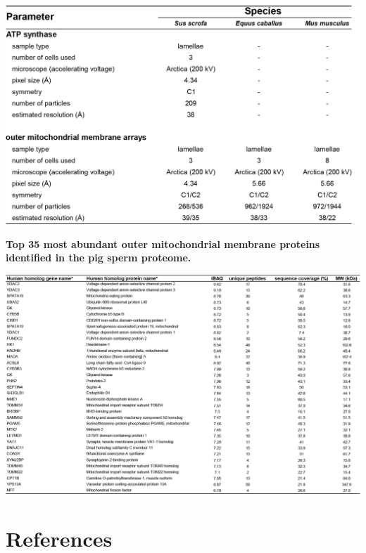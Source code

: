 \begin{subappendices}
\begin{table}[hbt!]
        \includegraphics[]{Chapter.4/Figures/SI_Table1.png}
        \label{tab:ch4_app_tab1}
    \end{table}
    \begin{table}[hbt!]
        \caption{\textbf{Top 35 most abundant outer mitochondrial membrane proteins identified in the pig sperm proteome.}}
        \includegraphics[]{Chapter.4/Figures/SI_Table2.png}
        \label{tab:ch4_app_tab2}
    \end{table}
\end{subappendices}
\clearpage
\section*{References}


\stopthumb
